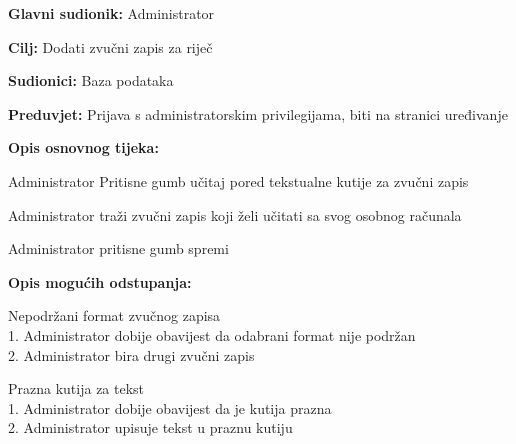 					\noindent {}
					\begin{packed_item}
						\item \textbf{Glavni sudionik:} Administrator
						\item \textbf{Cilj:} Dodati zvučni zapis za riječ
						\item \textbf{Sudionici:} Baza podataka
						\item \textbf{Preduvjet:} Prijava s administratorskim privilegijama, biti na stranici uređivanje
						\item \textbf{Opis osnovnog tijeka:}
						\begin{packed_enum}
							\item Administrator Pritisne gumb učitaj pored tekstualne kutije za zvučni zapis
							\item Administrator traži zvučni zapis koji želi učitati sa svog osobnog računala
							\item Administrator pritisne gumb spremi
						\end{packed_enum}
						\item \textbf{Opis mogućih odstupanja:}
						\begin{packed_item}
							\item [2.a] Nepodržani format zvučnog zapisa
							\\1. Administrator dobije obavijest da odabrani format nije podržan
							\\2. Administrator bira drugi zvučni zapis
							\item [3.a] Prazna kutija za tekst
							\\1. Administrator dobije obavijest da je kutija prazna
							\\2. Administrator upisuje tekst u praznu kutiju
						\end{packed_item}
					\end{packed_item}
					
